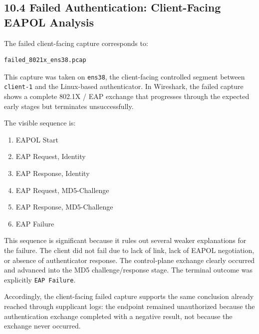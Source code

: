 \documentclass[11pt]{article}
\begin{document}

\subsection{10.4 Failed Authentication: Client-Facing EAPOL Analysis}
\label{sec:failed-authentication-client-facing-eapol-analysis}

The failed client-facing capture corresponds to:

\begin{verbatim}
failed_8021x_ens38.pcap
\end{verbatim}

This capture was taken on \texttt{ens38}, the client-facing controlled segment between \texttt{client-1} and the Linux-based authenticator. In Wireshark, the failed capture shows a complete 802.1X / EAP exchange that progresses through the expected early stages but terminates unsuccessfully.

The visible sequence is:

\begin{enumerate}
    \item EAPOL Start
    \item EAP Request, Identity
    \item EAP Response, Identity
    \item EAP Request, MD5-Challenge
    \item EAP Response, MD5-Challenge
    \item EAP Failure
\end{enumerate}

This sequence is significant because it rules out several weaker explanations for the failure. The client did not fail due to lack of link, lack of EAPOL negotiation, or absence of authenticator response. The control-plane exchange clearly occurred and advanced into the MD5 challenge/response stage. The terminal outcome was explicitly \texttt{EAP Failure}.

Accordingly, the client-facing failed capture supports the same conclusion already reached through supplicant logs: the endpoint remained unauthorized because the authentication exchange completed with a negative result, not because the exchange never occurred.
\end{document}
